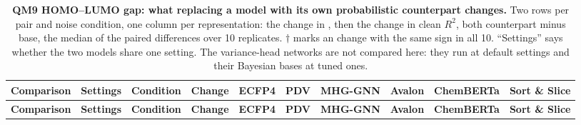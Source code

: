 
{\scriptsize
\begin{longtable}{llllcccccc}
\caption{\textbf{\SuppFile{} QM9 HOMO--LUMO gap: what replacing a model with its own probabilistic counterpart changes.}
Two rows per pair and noise condition, one column per representation: the change in \aucnorm{}, then the change in clean $R^2$, both counterpart minus base, the median of the paired differences over 10 replicates. $\dagger$ marks an \aucnorm{} change with the same sign in all 10. ``Settings'' says whether the two models share one setting. The variance-head networks are not compared here: they run at default settings and their Bayesian bases at tuned ones.}
\label{supp:counterparts_qm9}\\
\toprule
\textbf{Comparison} & \textbf{Settings} & \textbf{Condition} & \textbf{Change} & \textbf{ECFP4} & \textbf{PDV} & \textbf{MHG-GNN} & \textbf{Avalon} & \textbf{ChemBERTa} & \textbf{Sort \& Slice} \\
\midrule
\endfirsthead
\toprule
\textbf{Comparison} & \textbf{Settings} & \textbf{Condition} & \textbf{Change} & \textbf{ECFP4} & \textbf{PDV} & \textbf{MHG-GNN} & \textbf{Avalon} & \textbf{ChemBERTa} & \textbf{Sort \& Slice} \\
\midrule
\endhead

\bottomrule
\end{longtable}}

